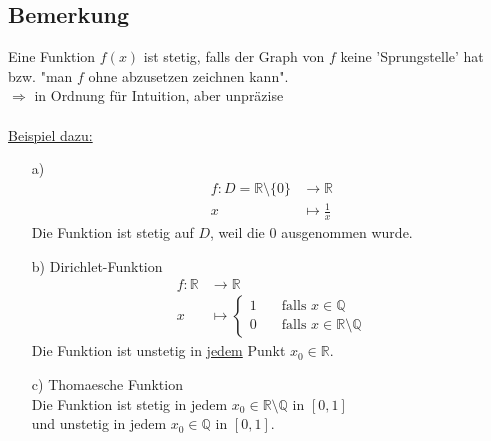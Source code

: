 \documentclass[12pt, titlepage]{article}
\newcommand{\R}{\mathds{R}}
\renewcommand{\>}{\rightarrow}
\renewcommand{\*}{\cdot}
\begin{document}
	\subsection{Bemerkung}
	Eine Funktion $f(x)$ ist stetig, falls der Graph von $f$ keine 'Sprungstelle' hat bzw. "man $f$ ohne abzusetzen zeichnen kann".\\
	$\Rightarrow$ in Ordnung für Intuition, aber unpräzise\\
	\\
	\underline{Beispiel dazu:}
	\begin{itemize}
		\item[a)]
		\begin{align*}
			f\colon D=\R\setminus\{0\}&\>\R\\x&\mapsto\frac{1}{x}
		\end{align*}
		Die Funktion ist stetig auf $D$, weil die $0$ ausgenommen wurde.
		\item[b)] Dirichlet-Funktion
		\begin{align*}
			f\colon\R&\>\R\\
			x&\mapsto\begin{cases}1\quad&\textrm{falls }x\in\mathds{Q}\\
			0\quad&\textrm{falls }x\in\R\setminus\mathds{Q}
			\end{cases}
		\end{align*}
		Die Funktion ist unstetig in \underline{jedem} Punkt $x_0\in\R$.
		\item[c)] Thomaesche Funktion\\
		Die Funktion ist stetig in jedem $x_0\in\R\setminus\mathds{Q}$ in $[0,1]$\\
		und unstetig in jedem $x_0\in\mathds{Q}$ in $[0,1]$.
	\end{itemize}
\end{document}
